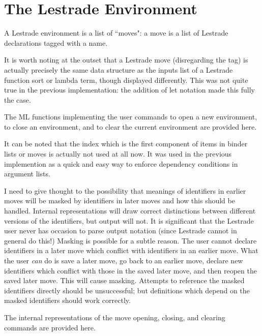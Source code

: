 \documentclass[12pt]{article}
\begin{document}
\newpage

\section{The Lestrade Environment}

A Lestrade environment is a list of ``moves": a move is a list of Lestrade declarations tagged with a name.

It is worth noting at the outset that a Lestrade move (disregarding the tag) is actually precisely the same data structure as the inputs list of a Lestrade function sort or lambda term, though displayed differently.  This was not quite true in the previous implementation:
the addition of let notation made this fully the case.

The ML functions implementing the user commands to open a new environment, to close an environment, and to clear the current environment are provided here.

It can be noted that the index which is the first component of items in binder lists or moves is actually not used at all now.  It was used in the previous implemention
as a quick and easy way to enforce dependency conditions in argument lists.

I need to give thought to the possibility that meanings of identifiers in earlier moves will be masked by identifiers in later moves and how this should be handled.  Internal
representations will draw correct distinctions between different versions of the identifiers, but output will not.  It is significant that the Lestrade user never has occasion
to parse output notation (since Lestrade cannot in general do this!)  Masking is possible for a subtle reason.  The user cannot declare identifiers in a later move which conflict with identifiers in an earlier move. What the user {\em can\/} do is save a later move, go back to an earlier move, declare new identifiers which conflict with those in the saved later move, and then reopen the saved later move.  This will cause masking.  Attempts to reference the masked identifiers directly should be unsuccessful;  but definitions which depend on the masked identifiers should work correctly.

The internal representations of the move opening, closing, and clearing commands are provided here.
\end{document}
